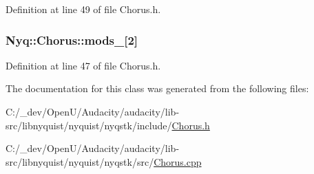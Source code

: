 Definition at line 49 of file Chorus.\+h.

\subsubsection[{\texorpdfstring{mods\+\_\+}{mods_}}]{ Nyq\+::\+Chorus\+::mods\+\_\+\mbox{[}2\mbox{]}\hspace{0.3cm}{\ttfamily [protected]}}\hypertarget{class_nyq_1_1_chorus_a8d18ce2356060a76fa5ac57893f4a507}{}\label{class_nyq_1_1_chorus_a8d18ce2356060a76fa5ac57893f4a507}


Definition at line 47 of file Chorus.\+h.



The documentation for this class was generated from the following files\+:\begin{DoxyCompactItemize}
\item 
C\+:/\+\_\+dev/\+Open\+U/\+Audacity/audacity/lib-\/src/libnyquist/nyquist/nyqstk/include/\hyperlink{_chorus_8h}{Chorus.\+h}\item 
C\+:/\+\_\+dev/\+Open\+U/\+Audacity/audacity/lib-\/src/libnyquist/nyquist/nyqstk/src/\hyperlink{_chorus_8cpp}{Chorus.\+cpp}\end{DoxyCompactItemize}
